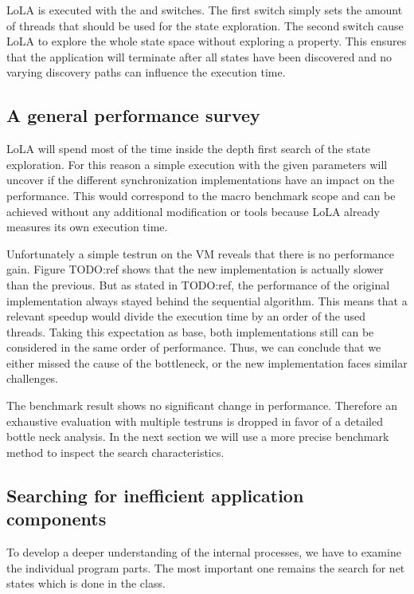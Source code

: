 LoLA is executed with the  and  switches. The first switch simply sets the amount of threads that should be used for the state exploration. The second switch cause LoLA to explore the whole state space without exploring a property. This ensures that the application will terminate after all states have been discovered and no varying discovery paths can influence the execution time.

\subsection{A general performance survey}
LoLA will spend most of the time inside the depth first search of the state exploration. For this reason a simple execution with the given parameters will uncover if the different synchronization implementations have an impact on the performance. This would correspond to the macro benchmark scope and can be achieved without any additional modification or tools because LoLA already measures its own execution time.

Unfortunately a simple testrun on the VM reveals that there is no performance gain. Figure TODO:ref shows that the new implementation is actually slower than the previous. But as stated in TODO:ref, the performance of the original implementation always stayed behind the sequential algorithm. This means that a relevant speedup would divide the execution time by an order of the used threads. Taking this expectation as base, both implementations still can be considered in the same order of performance. Thus, we can conclude that we either missed the cause of the bottleneck, or the new implementation faces similar challenges.



The benchmark result shows no significant change in performance. Therefore an exhaustive evaluation with multiple testruns is dropped in favor of a detailed bottle neck analysis. In the next section we will use a more precise benchmark method to inspect the search characteristics.

\subsection{Searching for inefficient application components}
To develop a deeper understanding of the internal processes, we have to examine the individual program parts. The most important one remains the search for net states which is done in the  class.

